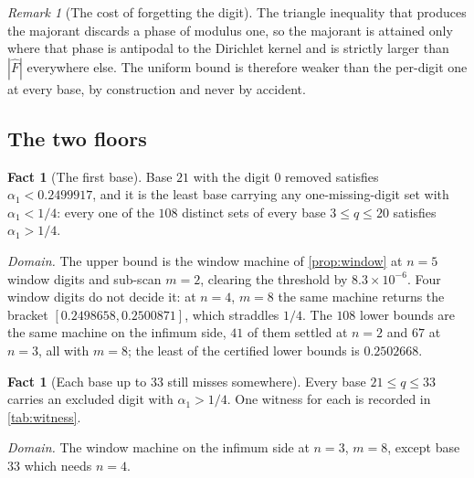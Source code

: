 \documentclass[11pt]{amsart}
\theoremstyle{definition}
\newtheorem{fact}[theorem]{Fact}
\theoremstyle{remark}
\newtheorem{remark}[theorem]{Remark}
\begin{document}
\begin{remark}[The cost of forgetting the digit]
\label{rem:cost}
The triangle inequality that produces the majorant discards a phase of modulus one, so the majorant is attained only where that phase is antipodal to the Dirichlet kernel and is strictly larger than $|\widehat{F}|$ everywhere else. The uniform bound is therefore weaker than the per-digit one at every base, by construction and never by accident.
\end{remark}

\subsection{The two floors}
\label{sub:floors}

\begin{fact}[The first base]
\label{fact:floor21}
Base $21$ with the digit $0$ removed satisfies $\alpha_{1} < 0.2499917$, and it is the least base carrying any one-missing-digit set with $\alpha_{1} < 1/4$: every one of the $108$ distinct sets of every base $3 \le q \le 20$ satisfies $\alpha_{1} > 1/4$.

\emph{Domain.} The upper bound is the window machine of \cref{prop:window} at $n = 5$ window digits and sub-scan $m = 2$, clearing the threshold by $8.3 \times 10^{-6}$. Four window digits do not decide it: at $n = 4$, $m = 8$ the same machine returns the bracket $[0.2498658, 0.2500871]$, which straddles $1/4$. The $108$ lower bounds are the same machine on the infimum side, $41$ of them settled at $n = 2$ and $67$ at $n = 3$, all with $m = 8$; the least of the certified lower bounds is $0.2502668$.
\end{fact}

\begin{fact}[Each base up to 33 still misses somewhere]
\label{fact:witness}
Every base $21 \le q \le 33$ carries an excluded digit with $\alpha_{1} > 1/4$. One witness for each is recorded in \cref{tab:witness}.

\emph{Domain.} The window machine on the infimum side at $n = 3$, $m = 8$, except base $33$ which needs $n = 4$.
\end{fact}
\end{document}
